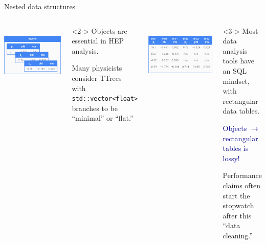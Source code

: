 \documentclass[aspectratio=169]{beamer}
\begin{document}
\begin{frame}{Nested data structures}
\large
\vspace{0.5 cm}
\begin{columns}[t]
\mbox{ } \hfill \includegraphics[width=0.75\linewidth]{muons-as-objects.png} \hfill \mbox{ }

\vspace{0.25 cm}
\begin{uncoverenv}<2->
Objects are essential in HEP analysis.

\vspace{0.25 cm}
Many physicists consider TTrees with {\tt\small std::vector<float>} branches to be ``minimal'' or ``flat.''
\end{uncoverenv}

\mbox{ } \hfill \includegraphics[width=0.75\linewidth]{muons-as-a-table.png} \hfill \mbox{ }

\vspace{0.25 cm}
\begin{uncoverenv}<3->
Most data analysis tools have an SQL mindset, with rectangular data tables.

\vspace{0.25 cm}
\textcolor{darkblue}{Objects $\to$ rectangular tables is lossy!}

\vspace{0.25 cm}
Performance claims often start the stopwatch after this ``data cleaning.''
\end{uncoverenv}
\end{columns}
\end{frame}
\end{document}
